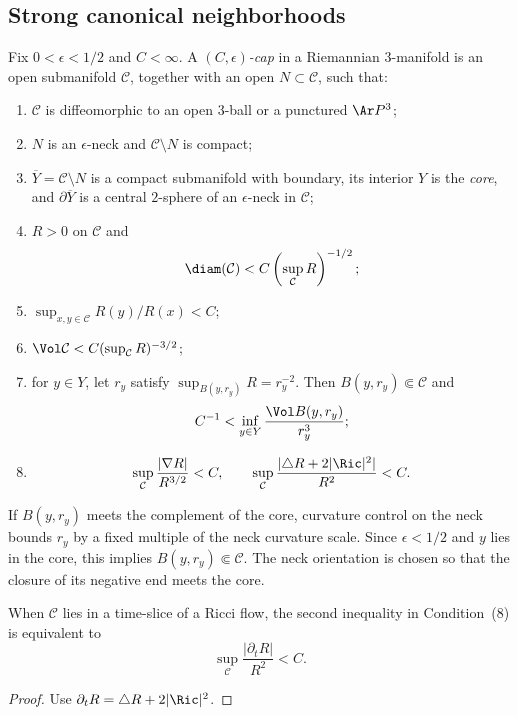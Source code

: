 \subsection{Strong canonical neighborhoods}

\begin{definition}\label{def:c-epsilon-cap}
\label{epscap}
Fix $0<\epsilon<1/2$ and $C<\infty$. A
\emph{$(C,\epsilon)$-cap} in a Riemannian $3$-manifold is an open
submanifold $\mathcal C$, together with an open $N\subset\mathcal C$,
such that:
\begin{enumerate}
\item[(1)] $\mathcal C$ is diffeomorphic to an open $3$-ball or a
punctured $\Ar P^3$;
\item[(2)] $N$ is an $\epsilon$-neck and
$\mathcal C\setminus N$ is compact;
\item[(3)] $\overline Y=\mathcal C\setminus N$ is a compact
submanifold with boundary, its interior $Y$ is the \emph{core}, and
$\partial\overline Y$ is a central $2$-sphere of an
$\epsilon$-neck in $\mathcal C$;
\item[(4)] $R>0$ on $\mathcal C$ and
\[
 \diam(\mathcal C)<C\left(\sup_{\mathcal C}R\right)^{-1/2};
\]
\item[(5)] $\sup_{x,y\in\mathcal C}R(y)/R(x)<C$;
\item[(6)]
$\Vol\mathcal C<C(\sup_{\mathcal C}R)^{-3/2}$;
\item[(7)] for $y\in Y$, let $r_y$ satisfy
$\sup_{B(y,r_y)}R=r_y^{-2}$. Then
$B(y,r_y)\Subset\mathcal C$ and
\[
 C^{-1}<\inf_{y\in Y}\frac{\Vol B(y,r_y)}{r_y^3};
\]
\item[(8)]
\[
 \sup_{\mathcal C}\frac{|\nabla R|}{R^{3/2}}<C,
 \qquad
 \sup_{\mathcal C}\frac{|\triangle R+2|\Ric|^2|}{R^2}<C.
\]
\end{enumerate}
\end{definition}

\begin{remark}\label{rem:cap-core-ball-remark}
If $B(y,r_y)$ meets the complement of the core, curvature control on
the neck bounds $r_y$ by a fixed multiple of the neck curvature
scale. Since $\epsilon<1/2$ and $y$ lies in the core, this implies
$B(y,r_y)\Subset\mathcal C$. The neck orientation is chosen so that
the closure of its negative end meets the core.
\end{remark}

\begin{claim}\label{claim:cap-condition-time-derivative-equivalence}
\label{partialtR}
When $\mathcal C$ lies in a time-slice of a Ricci flow, the second
inequality in Condition~(8) is equivalent to
\[
 \sup_{\mathcal C}\frac{|\partial_tR|}{R^2}<C.
\]
\end{claim}
\begin{proof}
\sketch Use $\partial_tR=\triangle R+2|\Ric|^2$.
\end{proof}

